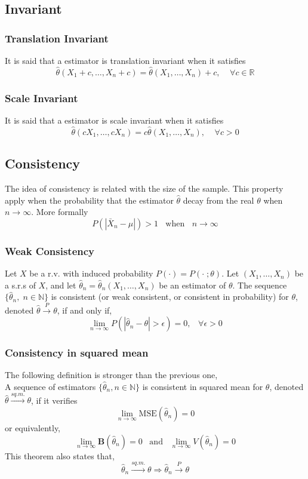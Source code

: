 \subsection{Invariant}
\subsubsection{Translation Invariant}
It is said that a estimator is translation invariant when it satisfies
\[ \hat{\theta}(X_1 + c,\dots,X_n + c) = \hat{\theta}(X_1,\dots,X_n) +
c,\;\;\;\; \forall c \in \mathbb{R}\]

\subsubsection{Scale Invariant}
It is said that a estimator is scale invariant when it satisfies
\[ \hat{\theta}(cX_1,\dots,cX_n) = c\hat{\theta}(X_1,\dots,X_n) ,\;\;\;\;
\forall c > 0 \]

\subsection{Consistency}
The idea of consistency is related with the size of the sample. This property
apply when the probability that the estimator $\hat{\theta}$ decay from the real
$\theta$ when $n\rightarrow\infty$. More formally 
\[ P(|\bar{X}_n - \mu|) > 1 \;\;\text{ when }\;\; n\rightarrow\infty\]

\subsubsection{Weak Consistency}
Let $X$ be a r.v. with induced probability $P( \cdot ) = P(\cdot\;;\theta)$. Let
$(X_1,\dots,X_n)$ be a s.r.s of $X$, and let $\hat{\theta}_n =
\hat{\theta}_n(X_1,\dots,X_n)$ be an estimator of $\theta$. The sequence
$\{\hat{\theta}_n,\; n \in \mathbb{N}\}$ is consistent (or weak consistent, or
consistent in probability) for $\theta$, denoted
$\hat{\theta}\xrightarrow{P}\theta$, if and only if,
\[ \lim_{n\rightarrow\infty} P(|\hat{\theta}_n - \theta| > \epsilon)=0,\;\;\;
\forall \epsilon>0\]

\subsubsection{Consistency in squared mean}
The following definition is stronger than the previous one,\\
A sequence of estimators $\{\hat{\theta}_n, n \in \mathbb{N}\}$ is consistent in
squared mean for $\theta$, denoted $\hat{\theta}\xrightarrow{sq.m.}\theta$, if
it verifies
\[ \lim_{n\rightarrow\infty} \text{MSE}(\hat{\theta}_n) = 0 \] or equivalently,
\[ \lim_{n\rightarrow\infty} \textbf{B}(\hat{\theta}_n) = 0 \;\;\;
\text{and}\;\;\; \lim_{n\rightarrow\infty} V(\hat{\theta}_n) = 0 \] This theorem
also states that,
\[ \hat{\theta}_n \xrightarrow{sq.m.}\theta \Rightarrow \hat{\theta}_n
\xrightarrow{P}\theta \]

